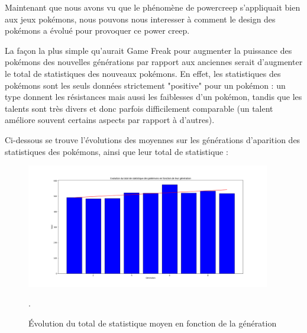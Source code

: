 \documentclass[a4paper,12pt]{article}
\begin{document}
Maintenant que nous avons vu que le phénomène de powercreep s'appliquait bien
aux jeux pokémons, nous pouvons nous interesser à comment le design des pokémons
a évolué pour provoquer ce power creep.

La façon la plus simple qu'aurait Game Freak pour augmenter la puissance des
pokémons des nouvelles générations par rapport aux anciennes serait d'augmenter
le total de statistiques des nouveaux pokémons. En effet, les statistiques des
pokémons sont les seuls données strictement "positive" pour un pokémon :  un
type donnent les résistances mais aussi les faiblesses d'un pokémon, tandis que
les talents sont très divers et donc parfois difficilement comparable (un talent
améliore souvent certains aspects par rapport à d'autres).

Ci-dessous se trouve l'évolutions des moyennes sur les générations d'aparition
des statistiques des pokémons, ainsi que leur total de statistique :

\begin{figure}[!h]
    \centering
    \includegraphics[width=0.95\textwidth]{Image/Total_avg.png}
    \caption{Évolution du total de statistique moyen en fonction de la
    génération}.
    \label{fig:image3}
\end{figure}
\end{document}
